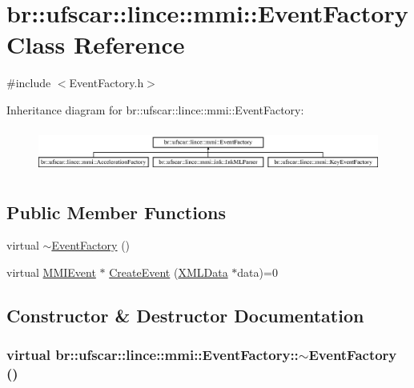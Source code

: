 \hypertarget{classbr_1_1ufscar_1_1lince_1_1mmi_1_1EventFactory}{
\section{br::ufscar::lince::mmi::EventFactory Class Reference}
\label{classbr_1_1ufscar_1_1lince_1_1mmi_1_1EventFactory}
}


{\ttfamily \#include $<$EventFactory.h$>$}

Inheritance diagram for br::ufscar::lince::mmi::EventFactory:\begin{figure}[H]
\begin{center}
\leavevmode
\includegraphics[height=1.45833cm]{classbr_1_1ufscar_1_1lince_1_1mmi_1_1EventFactory}
\end{center}
\end{figure}
\subsection*{Public Member Functions}
\begin{DoxyCompactItemize}
\item 
virtual \hyperlink{classbr_1_1ufscar_1_1lince_1_1mmi_1_1EventFactory_aeee49ee717f13144e6b1458e73c2a0b2}{$\sim$EventFactory} ()
\item 
virtual \hyperlink{classbr_1_1ufscar_1_1lince_1_1mmi_1_1MMIEvent}{MMIEvent} $\ast$ \hyperlink{classbr_1_1ufscar_1_1lince_1_1mmi_1_1EventFactory_a19ad2165726a29a55c921f569764290b}{CreateEvent} (\hyperlink{structbr_1_1ufscar_1_1lince_1_1mmi_1_1XMLData}{XMLData} $\ast$data)=0
\end{DoxyCompactItemize}


\subsection{Constructor \& Destructor Documentation}
\hypertarget{classbr_1_1ufscar_1_1lince_1_1mmi_1_1EventFactory_aeee49ee717f13144e6b1458e73c2a0b2}{
\subsubsection[{$\sim$EventFactory}]{\setlength{\rightskip}{0pt plus 5cm}virtual br::ufscar::lince::mmi::EventFactory::$\sim$EventFactory ()}}
\label{classbr_1_1ufscar_1_1lince_1_1mmi_1_1EventFactory_aeee49ee717f13144e6b1458e73c2a0b2}


